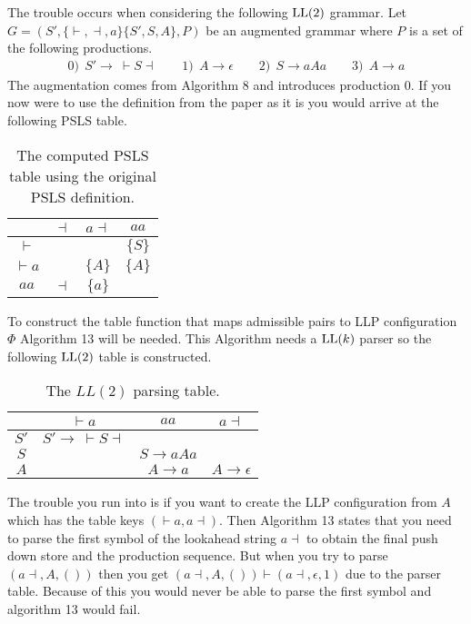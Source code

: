 The trouble occurs when considering the following $\text{LL}(2)$ grammar.
Let $G = (S', \{\vdash, \dashv, a\} \{S', S, A\}, P)$ be an augmented grammar where $P$ is a set of the following productions. 
\begin{align*}
    0)\:\: S' \to \: \vdash S \dashv \qquad 1)\:\: A \to \epsilon \qquad 2)\:\: S \to aAa \qquad 3)\:\: A \to a
\end{align*}
The augmentation comes from Algorithm 8 and introduces production 0. If you now were to use the definition from the paper as it is you would arrive at the following PSLS table.
\begin{table}[H]
    \centering
    \begin{tabular}{c|c|c|c}
        & $\dashv$ & $a\dashv$ & $aa$ \\ \hline
        $\vdash$ & & & $\{S\}$ \\\hline
        $\vdash a$ & & $\{A\}$ & $\{A\}$ \\\hline
        $aa$ & $\dashv$ & $\{a\}$ & 
    \end{tabular}
    \caption{The computed PSLS table using the original PSLS definition.}
\end{table}
\noindent To construct the table function that maps admissible pairs to LLP configuration $\Phi$ Algorithm 13 will be needed. This Algorithm needs a $\text{LL}(k)$ parser so the following $\text{LL}(2)$ table is constructed.
\begin{table}[H]
    \centering
    \begin{tabular}{c|c|c|c}
        & $\vdash a$ & $aa$ & $a\dashv$ \\ \hline
        $S'$ & $S' \to \: \vdash S \dashv$ & & \\\hline
        $S$ & & $S \to aAa$ & \\\hline
        $A$ & & $A \to a$ & $A \to \epsilon$
    \end{tabular}
    \caption{The $LL(2)$ parsing table.}
\end{table}
\noindent The trouble you run into is if you want to create the LLP configuration from $A$ which has the table keys $(\vdash a,a \dashv)$. Then Algorithm 13 states that you need to parse the first symbol of the lookahead string $a \dashv$ to obtain the final push down store and the production sequence. But when you try to parse $(a \dashv, A, ())$ then you get $(a \dashv, A, ()) \vdash (a \dashv, \epsilon, 1)$ due to the parser table. Because of this you would never be able to parse the first symbol and algorithm 13 would fail.

